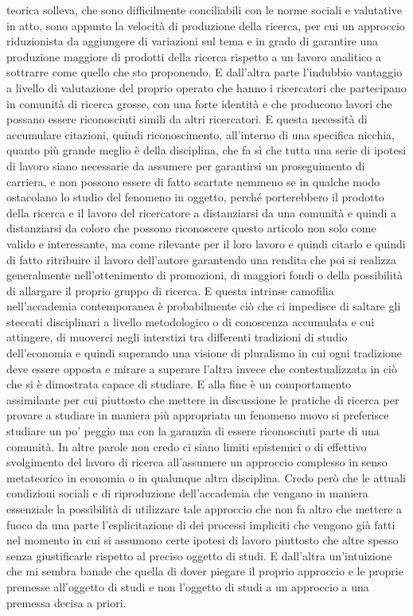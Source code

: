 \documentclass[a4paper, headings=standardclasses]{scrartcl}
\begin{document}
teorica solleva, che sono difficilmente conciliabili con le norme sociali e valutative in atto,
sono appunto la velocità di produzione della ricerca, per cui un approccio riduzionista
da aggiungere di variazioni sul tema e in grado di garantire una produzione maggiore di prodotti
della ricerca rispetto a un lavoro analitico a sottrarre come quello che sto proponendo.
E dall'altra parte l'indubbio vantaggio a livello di valutazione del proprio operato che hanno i
ricercatori che partecipano in comunità di ricerca grosse, con una forte identità e che
producono lavori che possano essere riconosciuti simili da altri ricercatori.
E questa necessità di accumulare citazioni, quindi riconoscimento, all'interno di una
specifica nicchia, quanto più grande meglio è della disciplina, che fa sì che tutta una serie
di ipotesi di lavoro siano necessarie da assumere per garantirsi un proseguimento di carriera,
e non possono essere di fatto scartate nemmeno se in qualche modo ostacolano lo studio del
fenomeno in oggetto, perché porterebbero il prodotto della ricerca e il lavoro del ricercatore
a distanziarsi da una comunità e quindi a distanziarsi da coloro che possono riconoscere
questo articolo non solo come valido e interessante, ma come rilevante per il loro lavoro e quindi
citarlo e quindi di fatto ritribuire il lavoro dell'autore garantendo una rendita che poi si
realizza generalmente nell'ottenimento di promozioni, di maggiori fondi o della possibilità
di allargare il proprio gruppo di ricerca. E questa intrinse camofilia nell'accademia contemporanea
è probabilmente ciò che ci impedisce di saltare gli steccati disciplinari a livello metodologico
o di conoscenza accumulata e cui attingere, di muoverci negli interstizi tra differenti tradizioni
di studio dell'economia e quindi superando una visione di pluralismo in cui ogni tradizione
deve essere opposta e mirare a superare l'altra invece che contestualizzata in ciò che si è
dimostrata capace di studiare. E alla fine è un comportamento assimilante per cui piuttosto
che mettere in discussione le pratiche di ricerca per provare a studiare in maniera più appropriata
un fenomeno nuovo si preferisce studiare un po' peggio ma con la garanzia di essere riconosciuti
parte di una comunità. In altre parole non credo ci siano limiti epistemici o di effettivo svolgimento
del lavoro di ricerca all'assumere un approccio complesso in senso metateorico in economia o in qualunque
altra disciplina. Credo però che le attuali condizioni sociali e di riproduzione dell'accademia
che vengano in maniera essenziale la possibilità di utilizzare tale approccio che non fa altro che
mettere a fuoco da una parte l'esplicitazione di dei processi impliciti che vengono già fatti
nel momento in cui si assumono certe ipotesi di lavoro piuttosto che altre spesso senza giustificarle
rispetto al preciso oggetto di studi. E dall'altra un'intuizione che mi sembra banale
che quella di dover piegare il proprio approccio e le proprie premesse all'oggetto di studi
e non l'oggetto di studi a un approccio a una premessa decisa a priori.

	
\end{document}
